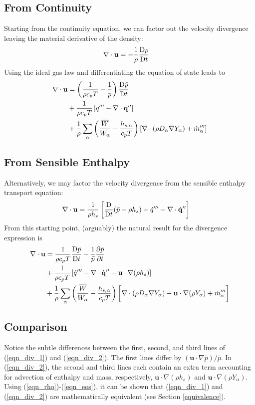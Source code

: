 \subsection*{From Continuity}
Starting from the continuity equation, we can factor out the velocity divergence leaving the material derivative of the density:
\begin{align}
\nabla\cdot\mathbf{u} &= -\frac{1}{\rho}\frac{\mbox{D}\rho}{\mbox{D} t}
\end{align}
Using the ideal gas law and differentiating the equation of state leads to
\begin{align}
\label{eqn_div_1}
\nabla\cdot\mathbf{u} &= \left(\frac{1}{\rho c_p T} - \frac{1}{\bar{p}} \right)\frac{\mbox{D} \bar{p}}{\mbox{D} t} \notag\\
&+ \frac{1}{\rho c_p T} \left[ \dot{q}^{\prime\prime\prime} - \nabla\cdot \dot{\mathbf{q}}^{\prime\prime} \right] \notag\\
&+ \frac{1}{\rho} \sum_\alpha \left(\frac{\overline{W}}{W_\alpha} - \frac{h_{s,\alpha}}{c_p T} \right) \left[ \nabla\cdot (\rho D_\alpha \nabla Y_\alpha) + \dot{m}_\alpha^{\prime\prime\prime} \right]
\end{align}

\subsection*{From Sensible Enthalpy}
Alternatively, we may factor the velocity divergence from the sensible enthalpy transport equation:
\begin{align}
\label{eqn_div_new}
\nabla\cdot\mathbf{u} &= \frac{1}{\rho h_s} \left[ \frac{\mbox{D}}{\mbox{D} t}(\bar{p}-\rho h_s) + \dot{q}^{\prime\prime\prime} - \nabla\cdot \dot{\mathbf{q}}^{\prime\prime} \right]
\end{align}
From this starting point, (arguably) the natural result for the divergence expression is
\begin{align}
\label{eqn_div_2}
\nabla\cdot\mathbf{u} &= \frac{1}{\rho c_p T}\frac{\mbox{D} \bar{p}}{\mbox{D} t} - \frac{1}{\bar{p}} \frac{\partial \bar{p}}{\partial t} \notag\\
&+ \frac{1}{\rho c_p T}\left[ \dot{q}^{\prime\prime\prime} - \nabla\cdot \dot{\mathbf{q}}^{\prime\prime} - \mathbf{u} \cdot\nabla (\rho h_s) \right] \notag\\
&+ \frac{1}{\rho} \sum_\alpha \left(\frac{\overline{W}}{W_\alpha} - \frac{h_{s,\alpha}}{c_p T} \right) \bigg[ \nabla\cdot (\rho D_\alpha \nabla Y_\alpha) - \mathbf{u} \cdot \nabla (\rho Y_\alpha) + \dot{m}_\alpha^{\prime\prime\prime}\bigg]
\end{align}

\subsection*{Comparison}
Notice the subtle differences between the first, second, and third lines of (\ref{eqn_div_1}) and (\ref{eqn_div_2}).  The first lines differ by $\displaystyle (\mathbf{u}\cdot\nabla \bar{p})/\bar{p}$. In (\ref{eqn_div_2}), the second and third lines each contain an extra term accounting for advection of enthalpy and mass, respectively, $\mathbf{u} \cdot\nabla (\rho h_s)$ and $\mathbf{u} \cdot \nabla (\rho Y_\alpha)$.  Using (\ref{eqn_rho})-(\ref{eqn_eos}), it can be shown that (\ref{eqn_div_1}) and (\ref{eqn_div_2}) are mathematically equivalent (see Section \ref{equivalence}).


